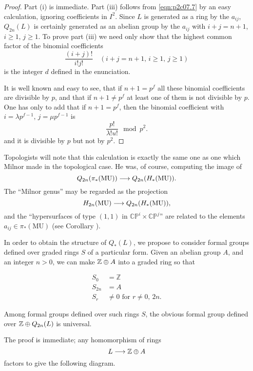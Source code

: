 \documentclass[../main]{subfiles}
\begin{document}
\begin{proof}
Part (i) is immediate. Part (iii) follows from \eqref{eqn:p2c07.7} by an easy calculation, ignoring coefficients in $I^2$. Since $L$ is generated as a ring by the $a_{ij}$, $Q_{2n}(L)$ is certainly generated as an abelian group by the $a_{ij}$ with $i + j = n + 1$, $i \ge 1$, $j \ge 1$. To prove part (iii) we need only show that the highest common factor of the binomial coefficients $$\frac {(i+j)!} {i! j!} \quad (i + j = n + 1, \, i \ge 1, \, j \ge 1)$$ is the integer $d$ defined in the enunciation.

It is well known and easy to see, that if $n + 1 = p^f$ all these binomial coefficients are divisible by $p$, and that if $n + 1 \ne p^f$ at least one of them is not divisible by $p$. One has only to add that if $n + 1 = p^f$, then the binomial coefficient with $i = \lambda p^{f - 1}$, $j = \mu p^{f - 1}$ is $$\frac {p!} {\lambda! u!} \mod p^2.$$ and it is divisible by $p$ but not by $p^2$. 
\end{proof}

Topologists will note that this calculation is exactly the same one as one which Milnor made in the topological case. He was, of course, computing the image of $$Q_{2n}(\pi_\ast(\mathrm{MU})) \overset{}{\longrightarrow} Q_{2n}(H_\ast(\mathrm{MU})).$$ The ``Milnor genus'' may be regarded as the projection $$H_{2n}(\mathrm{MU}) \overset{}{\longrightarrow} Q_{2n}(H_\ast(\mathrm{MU})),$$ and the ``hypersurfaces of type $(1,1)$ in $\mathbb {CP}^i \times \mathbb {CP}^j$'' are related to the elements $a_{ij} \in \pi_\ast(\mathrm{MU})$ (see Corollary ). 

In order to obtain the structure of $Q_\ast(L)$, we propose to consider formal groups defined over graded rings $S$ of a particular form. Given an abelian group $A$, and an integer $n > 0$, we can make $\mathbb{Z} \oplus A$ into a graded ring so that 

\begin{align*}
S_0 & = \mathbb Z \\ S_{2n} & = A \\ S_r & \ne 0 \text { for } r \ne 0, \, 2n.
\end{align*}

\begin{lemma}
\label{lem:p2c07.10}
Among formal groups defined over such rings $S$, the obvious formal group defined over $\mathbb{Z} \oplus Q_{2n}(L)$ is universal.
\end{lemma}

The proof is immediate; any homomorphism of rings $$L \overset{}{\longrightarrow} \mathbb{Z} \oplus A$$ factors to give the following diagram.
\end{document}
